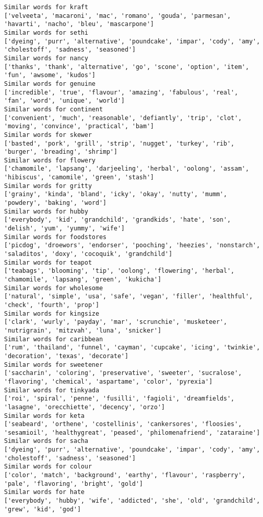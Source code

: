 \documentclass[11pt]{article}
\begin{document}
\begin{Verbatim}[commandchars=\\\{\}]
Similar words for kraft
['velveeta', 'macaroni', 'mac', 'romano', 'gouda', 'parmesan', 'havarti', 'nacho', 'bleu', 'mascarpone']
Similar words for sethi
['dyeing', 'purr', 'alternative', 'poundcake', 'impar', 'cody', 'amy', 'cholestoff', 'sadness', 'seasoned']
Similar words for nancy
['thanks', 'thank', 'alternative', 'go', 'scone', 'option', 'item', 'fun', 'awsome', 'kudos']
Similar words for genuine
['incredible', 'true', 'flavour', 'amazing', 'fabulous', 'real', 'fan', 'word', 'unique', 'world']
Similar words for continent
['convenient', 'much', 'reasonable', 'defiantly', 'trip', 'clot', 'moving', 'convince', 'practical', 'bam']
Similar words for skewer
['basted', 'pork', 'grill', 'strip', 'nugget', 'turkey', 'rib', 'burger', 'breading', 'shrimp']
Similar words for flowery
['chamomile', 'lapsang', 'darjeeling', 'herbal', 'oolong', 'assam', 'hibiscus', 'camomile', 'green', 'stash']
Similar words for gritty
['grainy', 'kinda', 'bland', 'icky', 'okay', 'nutty', 'mumm', 'powdery', 'baking', 'word']
Similar words for hubby
['everybody', 'kid', 'grandchild', 'grandkids', 'hate', 'son', 'delish', 'yum', 'yummy', 'wife']
Similar words for foodstores
['picdog', 'droewors', 'endorser', 'pooching', 'heezies', 'nonstarch', 'saladitos', 'doxy', 'cocoquik', 'grandchild']
Similar words for teapot
['teabags', 'blooming', 'tip', 'oolong', 'flowering', 'herbal', 'chamomile', 'lapsang', 'green', 'kukicha']
Similar words for wholesome
['natural', 'simple', 'usa', 'safe', 'vegan', 'filler', 'healthful', 'check', 'fourth', 'prop']
Similar words for kingsize
['clark', 'wurly', 'payday', 'mar', 'scrunchie', 'musketeer', 'nutrigrain', 'mitzvah', 'luna', 'snicker']
Similar words for caribbean
['rum', 'thailand', 'funnel', 'cayman', 'cupcake', 'icing', 'twinkie', 'decoration', 'texas', 'decorate']
Similar words for sweetener
['saccharin', 'coloring', 'preservative', 'sweeter', 'sucralose', 'flavoring', 'chemical', 'aspartame', 'color', 'pyrexia']
Similar words for tinkyada
['roi', 'spiral', 'penne', 'fusilli', 'fagioli', 'dreamfields', 'lasagne', 'orecchiette', 'decency', 'orzo']
Similar words for keta
['seabeard', 'orthene', 'costellinis', 'cankersores', 'floosies', 'sesamioil', 'healthygreat', 'peased', 'philomenafriend', 'zataraine']
Similar words for sacha
['dyeing', 'purr', 'alternative', 'poundcake', 'impar', 'cody', 'amy', 'cholestoff', 'sadness', 'seasoned']
Similar words for colour
['color', 'match', 'background', 'earthy', 'flavour', 'raspberry', 'pale', 'flavoring', 'bright', 'gold']
Similar words for hate
['everybody', 'hubby', 'wife', 'addicted', 'she', 'old', 'grandchild', 'grew', 'kid', 'god']

\end{Verbatim}
\end{document}
